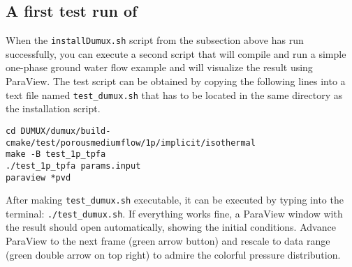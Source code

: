 \subsection{A first test run of \Dumux}
When the \texttt{installDumux.sh} script from the subsection above has run successfully, you can execute a second script that
will compile and run a simple one-phase ground water flow example and will visualize the result using ParaView.
The test script can be obtained by copying the following lines into a text file named \texttt{test\_dumux.sh}
that has to be located in the same directory as the installation script.
\begin{lstlisting}[style=DumuxCode]
cd DUMUX/dumux/build-cmake/test/porousmediumflow/1p/implicit/isothermal
make -B test_1p_tpfa
./test_1p_tpfa params.input
paraview *pvd
\end{lstlisting}
After making \texttt{test\_dumux.sh} executable, it can be executed by typing into the terminal: \texttt{./test\_dumux.sh}.
If everything works fine, a ParaView window with the result should open automatically, showing the initial
conditions. Advance ParaView to the next frame (green arrow button) and rescale to data range (green double arrow on top right) to admire
the colorful pressure distribution.
